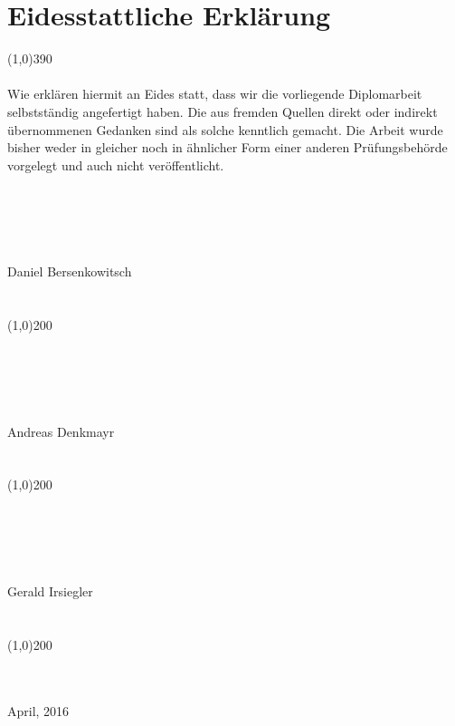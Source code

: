 \documentclass[FIPLY_base.tex]{subfiles}
\begin{document}
	\section{Eidesstattliche Erklärung}
	\line(1,0){390}
	\ \\
	\ \\
	Wie erklären hiermit an Eides statt, dass wir die vorliegende Diplomarbeit selbstständig
	angefertigt haben. Die aus fremden Quellen direkt oder indirekt übernommenen Gedanken sind als solche kenntlich gemacht. Die Arbeit wurde bisher weder in gleicher noch in ähnlicher Form einer anderen Prüfungsbehörde vorgelegt und auch nicht veröffentlicht.
	\ \\
	\ \\
	\ \\
	\ \\
	\ \\
	\ \\
	{\Large Daniel Bersenkowitsch}
	\ \\
	\ \\
	\ \\
	\line(1,0){200}
	\ \\
	\ \\
	\ \\
	\ \\
	\ \\
	\ \\
	{\Large Andreas Denkmayr}
	\ \\
	\ \\
	\ \\
	\line(1,0){200}
	\ \\
	\ \\
	\ \\
	\ \\
	\ \\
	\ \\
	{\Large Gerald Irsiegler}
	\ \\
	\ \\
	\ \\
	\line(1,0){200}
	\ \\
	\ \\
	\ \\
	\begin{flushright}
		April, 2016
	\end{flushright}
	
\end{document}
